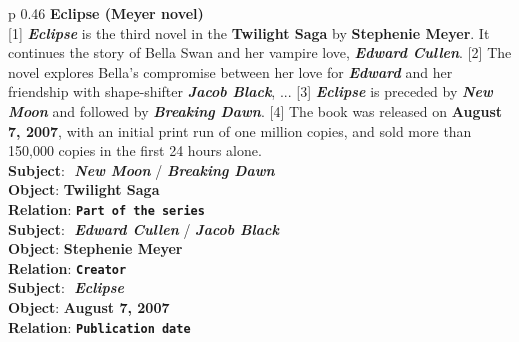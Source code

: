 \documentclass[11pt,a4paper]{article}
\newcommand\BASESIZE{\xspace}
\begin{document}
\begin{table}[!t]
\begin{center}

\begin{tabular}{p {0.46\textwidth}}
\toprule
\textbf{Eclipse (Meyer novel)} \\
{\color{olive} [1]} {\color{blue}\bf \textit{Eclipse}} is the third novel in the {\color{red} \bf Twilight Saga} by {\color{red} \bf Stephenie Meyer}. It continues the story of Bella Swan and her vampire love, {\color{blue}\bf \textit{Edward Cullen}}. 
{\color{olive} [2]}  The novel explores Bella's compromise between her love for {\color{blue}\bf \textit{Edward}} and her friendship with shape-shifter {\color{blue}\bf \textit{Jacob Black}},   ... 
{\color{olive} [3]} {\color{blue}\bf \textit{Eclipse}} is preceded by {\color{blue}\bf \textit{New Moon}} and followed by {\color{blue}\bf \textit{Breaking Dawn}}. 
{\color{olive} [4]} The book was released on {\color{red} \bf August 7, 2007}, with an initial print run of one million copies,  and sold more than 150,000 copies in the first 24 hours alone. \\
\midrule
\textbf{Subject}:\,\, {\color{blue}\bf \textit{New Moon}} / {\color{blue}\bf \textit{Breaking Dawn}}   \\
\textbf{Object}: \;  {\color{red} \bf Twilight Saga}  \\
\textbf{Relation}:  {\color{rel} \bf \texttt{Part of the series}}  \\
\midrule
\textbf{Subject}: \,\,{\color{blue}\bf \textit{Edward Cullen}} / {\color{blue}\bf \textit{Jacob Black}}  \\
\textbf{Object}: \;  {\color{red} \bf Stephenie Meyer} \\
\textbf{Relation}:   {\color{rel} \bf \texttt{Creator}} \\
\midrule
\textbf{Subject}:\,\, {\color{blue}\bf \textit{Eclipse}} \\
\textbf{Object}: \; {\color{red} \bf August 7, 2007} \\
\textbf{Relation}: {\color{rel} \bf \texttt{Publication date}} \\
\bottomrule
\end{tabular}
\end{center}
\caption{An example from DocRED~\citep{DocRED}. We show some relational facts detected by CorefBERT\BASESIZE but missed by BERT\BASESIZE.}

\label{tab:docred_case_study}

\end{table}
\end{document}
